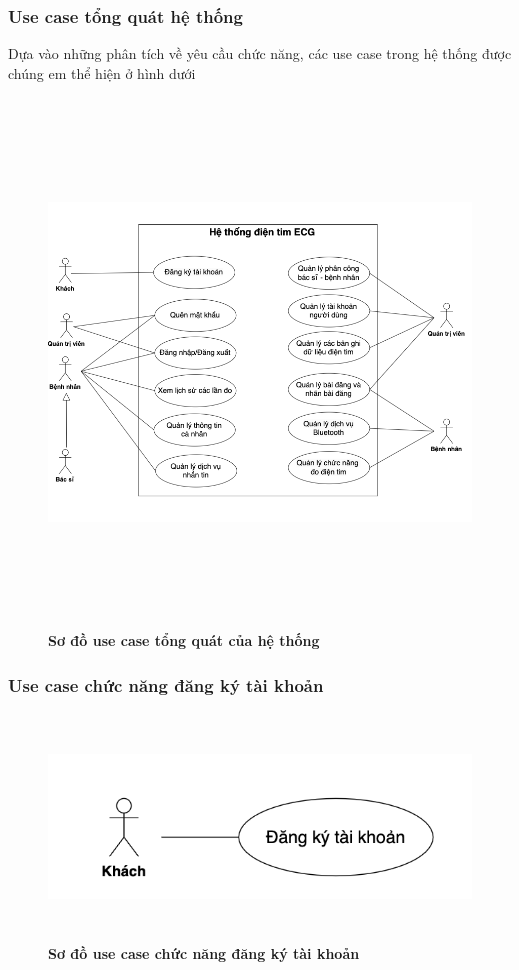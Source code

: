 \subsubsection{Use case tổng quát hệ thống}
Dựa vào những phân tích về yêu cầu chức năng, các use case trong hệ thống được chúng em thể hiện ở hình dưới 
  \begin{figure}[H]
    \centering
    \includegraphics[width=16cm,height=14cm]{Images/use_case/use_case_general.png}
    \caption[Sơ đồ use case tổng quát của hệ thống]{\bfseries \fontsize{12pt}{0pt}
    \selectfont Sơ đồ use case tổng quát của hệ thống}
    \label{use_case_general} %
  \end{figure}

\subsubsection{Use case chức năng đăng ký tài khoản}
  \begin{figure}[H]
    \centering
    \includegraphics[width=15cm,height=6cm]{Images/use_case/use_case_register.png}
    \caption[Sơ đồ use case chức năng đăng ký tài khoản]{\bfseries \fontsize{12pt}{0pt}
    \selectfont Sơ đồ use case chức năng đăng ký tài khoản}
    \label{use_case_register} %
  \end{figure}

